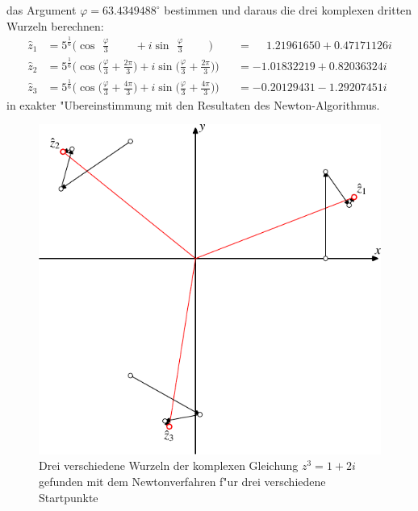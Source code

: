 \begin{beispiel}
das Argument $\varphi=63.4349488^\circ$ bestimmen und daraus
die drei komplexen dritten Wurzeln berechnen:
\begin{equation}
\begin{aligned}
\hat{z}_1
&=
5^{\frac16}
\biggl( \cos\phantom{\biggl(} \frac{\varphi}3
	\phantom{+\frac{2\pi}3\biggl)} \,
    +i\sin\phantom{\biggl(} \frac{\varphi}3
	\phantom{+\frac{4\pi}3\biggr)}\,\biggr)
&&=
\phantom{-}1.21961650 + 0.47171126i
\\
\hat{z}_2
&=
5^{\frac16} \biggl(\cos\biggl(\frac{\varphi}3+\frac{2\pi}3\biggr)
+i\sin\biggl(\frac{\varphi}3+\frac{2\pi}3\biggr)\biggr)
&&=
-1.01832219 + 0.82036324i
\\
\hat{z}_3
&=
5^{\frac16} \biggl(\cos\biggl(\frac{\varphi}3+\frac{4\pi}3\biggr)
+i\sin\biggl(\frac{\varphi}3+\frac{4\pi}3\biggr)\biggr)
&&=
-0.20129431 -1.29207451i
\end{aligned}
\end{equation}
in exakter "Ubereinstimmung mit den Resultaten des Newton-Algorithmus.
\end{beispiel}
\begin{figure}
\centering
\includegraphics{chapters/images/randwert-3.pdf}
\caption{Drei verschiedene Wurzeln der komplexen Gleichung $z^3=1+2i$
gefunden mit dem Newtonverfahren f"ur drei verschiedene Startpunkte
\label{newton:2dgraphik}}
\end{figure}
